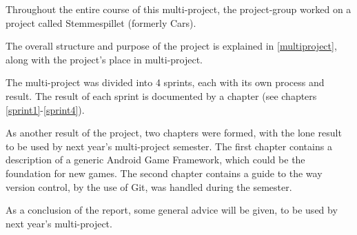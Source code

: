 Throughout the entire course of this multi-project, the project-group worked on a project called Stemmespillet (formerly Cars).

The overall structure and purpose of the project is explained in \cref{multiproject}, along with the project's place in multi-project.

The multi-project was divided into 4 sprints, each with its own process and result.
The result of each sprint is documented by a chapter (see chapters \ref{sprint1}-\ref{sprint4}).

As another result of the project, two chapters were formed, with the lone result to be used by next year's multi-project semester.
The first chapter contains a description of a generic Android Game Framework, which could be the foundation for new games.
The second chapter contains a guide to the way version control, by the use of Git, was handled during the semester.

As a conclusion of the report, some general advice will be given, to be used by next year's multi-project.